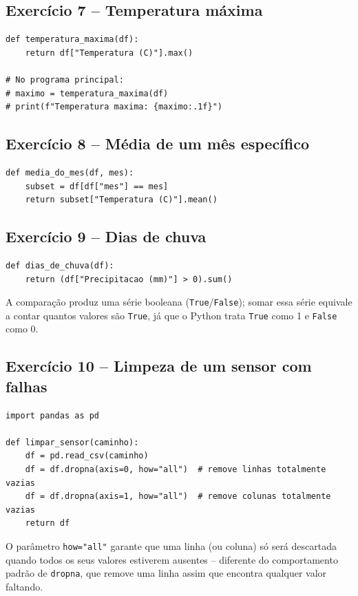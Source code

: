 \documentclass[11pt,a4paper]{article}
\begin{document}
\subsection*{Exercício 7 -- Temperatura máxima}
\begin{solucao}
\begin{lstlisting}
def temperatura_maxima(df):
    return df["Temperatura (C)"].max()

# No programa principal:
# maximo = temperatura_maxima(df)
# print(f"Temperatura maxima: {maximo:.1f}")
\end{lstlisting}
\end{solucao}

\subsection*{Exercício 8 -- Média de um mês específico}
\begin{solucao}
\begin{lstlisting}
def media_do_mes(df, mes):
    subset = df[df["mes"] == mes]
    return subset["Temperatura (C)"].mean()
\end{lstlisting}
\end{solucao}

\subsection*{Exercício 9 -- Dias de chuva}
\begin{solucao}
\begin{lstlisting}
def dias_de_chuva(df):
    return (df["Precipitacao (mm)"] > 0).sum()
\end{lstlisting}
A comparação produz uma série booleana (\texttt{True}/\texttt{False}); somar essa série equivale a contar quantos valores são \texttt{True}, já que o Python trata \texttt{True} como 1 e \texttt{False} como 0.
\end{solucao}

\subsection*{Exercício 10 -- Limpeza de um sensor com falhas}
\begin{solucao}
\begin{lstlisting}
import pandas as pd

def limpar_sensor(caminho):
    df = pd.read_csv(caminho)
    df = df.dropna(axis=0, how="all")  # remove linhas totalmente vazias
    df = df.dropna(axis=1, how="all")  # remove colunas totalmente vazias
    return df
\end{lstlisting}
O parâmetro \texttt{how="all"} garante que uma linha (ou coluna) só será descartada quando todos os seus valores estiverem ausentes -- diferente do comportamento padrão de \texttt{dropna}, que remove uma linha assim que encontra qualquer valor faltando.
\end{solucao}
\end{document}
